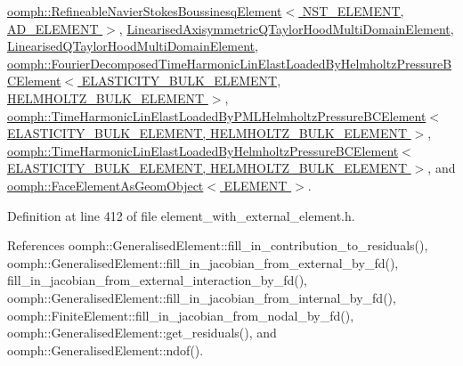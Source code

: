 \hyperlink{classoomph_1_1RefineableNavierStokesBoussinesqElement_aab6bae7d0704ab7e3e121ee594ac887a}{oomph\+::\+Refineable\+Navier\+Stokes\+Boussinesq\+Element$<$ N\+S\+T\+\_\+\+E\+L\+E\+M\+E\+N\+T, A\+D\+\_\+\+E\+L\+E\+M\+E\+N\+T $>$}, \hyperlink{classLinearisedAxisymmetricQTaylorHoodMultiDomainElement_adc20fbe7a713cb4b1d80c750698416ed}{Linearised\+Axisymmetric\+Q\+Taylor\+Hood\+Multi\+Domain\+Element}, \hyperlink{classLinearisedQTaylorHoodMultiDomainElement_ae408b0f2829214b7b5d5be7f5d03a604}{Linearised\+Q\+Taylor\+Hood\+Multi\+Domain\+Element}, \hyperlink{classoomph_1_1FourierDecomposedTimeHarmonicLinElastLoadedByHelmholtzPressureBCElement_ac5f6369682a12573e07f07651ffb2a5f}{oomph\+::\+Fourier\+Decomposed\+Time\+Harmonic\+Lin\+Elast\+Loaded\+By\+Helmholtz\+Pressure\+B\+C\+Element$<$ E\+L\+A\+S\+T\+I\+C\+I\+T\+Y\+\_\+\+B\+U\+L\+K\+\_\+\+E\+L\+E\+M\+E\+N\+T, H\+E\+L\+M\+H\+O\+L\+T\+Z\+\_\+\+B\+U\+L\+K\+\_\+\+E\+L\+E\+M\+E\+N\+T $>$}, \hyperlink{classoomph_1_1TimeHarmonicLinElastLoadedByPMLHelmholtzPressureBCElement_aec08514d7dbb65dc5c05af3131828daa}{oomph\+::\+Time\+Harmonic\+Lin\+Elast\+Loaded\+By\+P\+M\+L\+Helmholtz\+Pressure\+B\+C\+Element$<$ E\+L\+A\+S\+T\+I\+C\+I\+T\+Y\+\_\+\+B\+U\+L\+K\+\_\+\+E\+L\+E\+M\+E\+N\+T, H\+E\+L\+M\+H\+O\+L\+T\+Z\+\_\+\+B\+U\+L\+K\+\_\+\+E\+L\+E\+M\+E\+N\+T $>$}, \hyperlink{classoomph_1_1TimeHarmonicLinElastLoadedByHelmholtzPressureBCElement_a151fa0b3aa8df4a582d62d82ae42f40e}{oomph\+::\+Time\+Harmonic\+Lin\+Elast\+Loaded\+By\+Helmholtz\+Pressure\+B\+C\+Element$<$ E\+L\+A\+S\+T\+I\+C\+I\+T\+Y\+\_\+\+B\+U\+L\+K\+\_\+\+E\+L\+E\+M\+E\+N\+T, H\+E\+L\+M\+H\+O\+L\+T\+Z\+\_\+\+B\+U\+L\+K\+\_\+\+E\+L\+E\+M\+E\+N\+T $>$}, and \hyperlink{classoomph_1_1FaceElementAsGeomObject_a2835ee6ef417ec603c39a1f0f4e356f0}{oomph\+::\+Face\+Element\+As\+Geom\+Object$<$ E\+L\+E\+M\+E\+N\+T $>$}.



Definition at line 412 of file element\+\_\+with\+\_\+external\+\_\+element.\+h.



References oomph\+::\+Generalised\+Element\+::fill\+\_\+in\+\_\+contribution\+\_\+to\+\_\+residuals(), oomph\+::\+Generalised\+Element\+::fill\+\_\+in\+\_\+jacobian\+\_\+from\+\_\+external\+\_\+by\+\_\+fd(), fill\+\_\+in\+\_\+jacobian\+\_\+from\+\_\+external\+\_\+interaction\+\_\+by\+\_\+fd(), oomph\+::\+Generalised\+Element\+::fill\+\_\+in\+\_\+jacobian\+\_\+from\+\_\+internal\+\_\+by\+\_\+fd(), oomph\+::\+Finite\+Element\+::fill\+\_\+in\+\_\+jacobian\+\_\+from\+\_\+nodal\+\_\+by\+\_\+fd(), oomph\+::\+Generalised\+Element\+::get\+\_\+residuals(), and oomph\+::\+Generalised\+Element\+::ndof().



